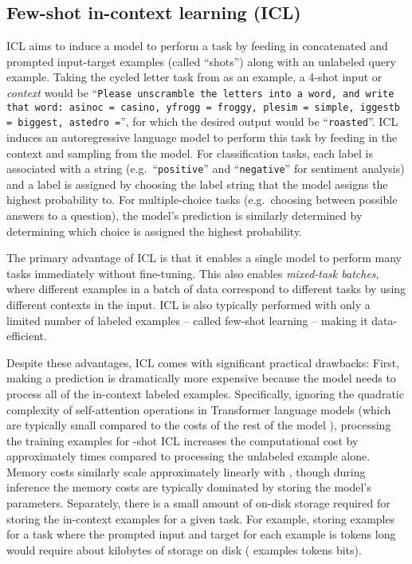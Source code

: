 \documentclass{article}
\begin{document}
\subsection{Few-shot in-context learning (ICL)}
\label{sec:icl}

ICL \citep{radford2019language,brown2020language} aims to induce a model to perform a task by feeding in concatenated and prompted input-target examples (called ``shots'') along with an unlabeled query example.
Taking the cycled letter task from \citet{brown2020language} as an example, a 4-shot input or \textit{context} would be ``\texttt{Please unscramble the letters into a word, and write that word: asinoc = casino, yfrogg = froggy, plesim = simple, iggestb = biggest, astedro =}'', for which the desired output would be ``\texttt{roasted}''.
ICL induces an autoregressive language model to perform this task by feeding in the context and sampling from the model.
For classification tasks, each label is associated with a string (e.g.\ ``\texttt{positive}'' and ``\texttt{negative}'' for sentiment analysis) and a label is assigned by choosing the label string that the model assigns the highest probability to.
For multiple-choice tasks (e.g.\ choosing between  possible answers to a question), the model's prediction is similarly determined by determining which choice is assigned the highest probability.

The primary advantage of ICL is that it enables a single model to perform many tasks immediately without fine-tuning.
This also enables \textit{mixed-task batches}, where different examples in a batch of data correspond to different tasks by using different contexts in the input.
ICL is also typically performed with only a limited number of labeled examples -- called few-shot learning -- making it data-efficient.

Despite these advantages, ICL comes with significant practical drawbacks:
First, making a prediction is dramatically more expensive because the model needs to process all of the in-context labeled examples.
Specifically, ignoring the quadratic complexity of self-attention operations in Transformer language models (which are typically small compared to the costs of the rest of the model \citep{kaplan2020scaling}), processing the  training examples for -shot ICL increases the computational cost by approximately  times compared to processing the unlabeled example alone.
Memory costs similarly scale approximately linearly with , though during inference the memory costs are typically dominated by storing the model's parameters.
Separately, there is a small amount of on-disk storage required for storing the in-context examples for a given task.
For example, storing  examples for a task where the prompted input and target for each example is  tokens long would require about  kilobytes of storage on disk ( examples  tokens  bits).
\end{document}
